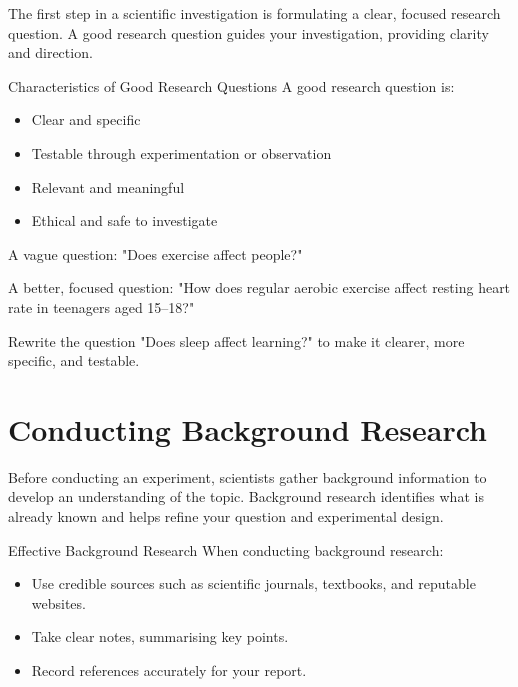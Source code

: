 The first step in a scientific investigation is formulating a clear, focused research question. A good research question guides your investigation, providing clarity and direction.

\begin{keyconcept}{Characteristics of Good Research Questions}
A good research question is:
\begin{itemize}
    \item Clear and specific
    \item Testable through experimentation or observation
    \item Relevant and meaningful
    \item Ethical and safe to investigate
\end{itemize}
\end{keyconcept}

\begin{example}
A vague question: "Does exercise affect people?"

A better, focused question: "How does regular aerobic exercise affect resting heart rate in teenagers aged 15–18?"
\end{example}

\begin{stopandthink}
Rewrite the question "Does sleep affect learning?" to make it clearer, more specific, and testable.
\end{stopandthink}

\section{Conducting Background Research}

Before conducting an experiment, scientists gather background information to develop an understanding of the topic. Background research identifies what is already known and helps refine your question and experimental design.

\begin{keyconcept}{Effective Background Research}
When conducting background research:
\begin{itemize}
    \item Use credible sources such as scientific journals, textbooks, and reputable websites.
    \item Take clear notes, summarising key points.
    \item Record references accurately for your report.
\end{itemize}
\end{keyconcept}

